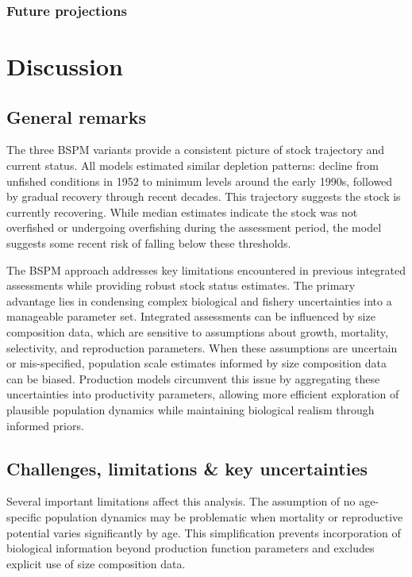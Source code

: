 \documentclass[
  11pt,
]{SCreport}
\begin{document}
\subsubsection{Future projections}\label{sec-projections}

\section{Discussion}\label{sec-discussion}

\subsection{General remarks}\label{general-remarks}

The three BSPM variants provide a consistent picture of stock trajectory
and current status. All models estimated similar depletion patterns:
decline from unfished conditions in 1952 to minimum levels around the
early 1990s, followed by gradual recovery through recent decades. This
trajectory suggests the stock is currently recovering. While median
estimates indicate the stock was not overfished or undergoing
overfishing during the assessment period, the
 model suggests some recent risk of
falling below these thresholds.

The BSPM approach addresses key limitations encountered in previous
integrated assessments while providing robust stock status estimates.
The primary advantage lies in condensing complex biological and fishery
uncertainties into a manageable parameter set. Integrated assessments
can be influenced by size composition data, which are sensitive to
assumptions about growth, mortality, selectivity, and reproduction
parameters. When these assumptions are uncertain or mis-specified,
population scale estimates informed by size composition data can be
biased. Production models circumvent this issue by aggregating these
uncertainties into productivity parameters, allowing more efficient
exploration of plausible population dynamics while maintaining
biological realism through informed priors.

\subsection{Challenges, limitations \& key
uncertainties}\label{challenges-limitations-key-uncertainties}

Several important limitations affect this analysis. The assumption of no
age-specific population dynamics may be problematic when mortality or
reproductive potential varies significantly by age. This simplification
prevents incorporation of biological information beyond production
function parameters and excludes explicit use of size composition data.
\end{document}
